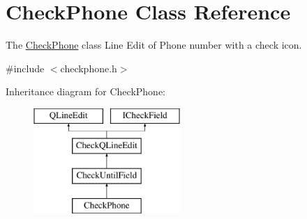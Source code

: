 \hypertarget{classCheckPhone}{\section{Check\+Phone Class Reference}
\label{classCheckPhone}
}


The \hyperlink{classCheckPhone}{Check\+Phone} class Line Edit of Phone number with a check icon.  




{\ttfamily \#include $<$checkphone.\+h$>$}

Inheritance diagram for Check\+Phone\+:\begin{figure}[H]
\begin{center}
\leavevmode
\includegraphics[height=4.000000cm]{d0/ddb/classCheckPhone}
\end{center}
\end{figure}
